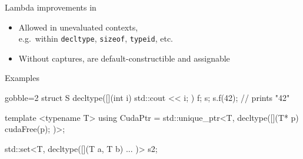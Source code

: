 \begin{advanced}
\begin{frame}[fragile]
  \begin{block}{Lambda improvements in }
    \begin{itemize}
      \item Allowed in unevaluated contexts,\\
            e.g.\ within \texttt{decltype}, \texttt{sizeof}, \texttt{typeid}, etc.
      \item Without captures, are default-constructible and assignable
    \end{itemize}
  \end{block}
  \begin{exampleblock}{Examples}
    \small
    \begin{cppcode*}{gobble=2}
      struct S {
        decltype([](int i) { std::cout << i; }) f;
      } s;
      s.f(42); // prints "42"

      template <typename T>
      using CudaPtr = std::unique_ptr<T,
                        decltype([](T* p){ cudaFree(p); })>;

      std::set<T, decltype([](T a, T b) { ... })> s2;
    \end{cppcode*}
  \end{exampleblock}

\end{frame}

\end{advanced}
